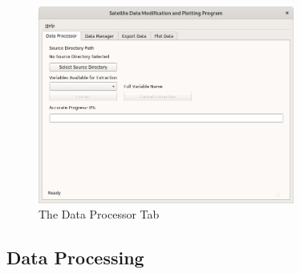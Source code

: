 \documentclass[../00_main.tex]{subfiles}
\begin{document}
\begin{figure}[H]
    \center
    \includegraphics[width=0.75\textwidth]{../graphics/dp01}
    \caption{The Data Processor Tab}
    \label{dp01}
\end{figure}

\subsection{Data Processing}
\end{document}

